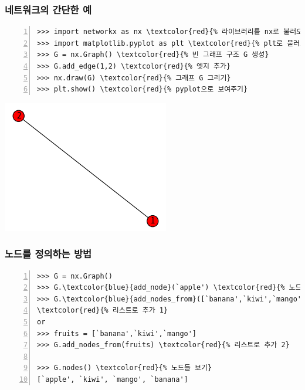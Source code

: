 \documentclass{beamer}
\begin{document}
\begin{frame}[fragile] %
\frametitle{네트워크의 간단한 예}
\begin{Verbatim}[numbers=left,commandchars=\\\{\}]
>>> import networkx as nx \textcolor{red}{% 라이브러리를 nx로 불러오기}
>>> import matplotlib.pyplot as plt \textcolor{red}{% plt로 불러오기}
>>> G = nx.Graph() \textcolor{red}{% 빈 그래프 구조 G 생성}
>>> G.add_edge(1,2) \textcolor{red}{% 엣지 추가}
>>> nx.draw(G) \textcolor{red}{% 그래프 G 그리기}
>>> plt.show() \textcolor{red}{% pyplot으로 보여주기}
\end{Verbatim}
\begin{center}
\includegraphics[scale=0.55]{line1.png}
\end{center}
\end{frame}

\begin{frame}[fragile]
\frametitle{노드를 정의하는 방법}
\begin{block}{}
\begin{Verbatim}[numbers=left,commandchars=\\\{\}]
>>> G = nx.Graph()
>>> G.\textcolor{blue}{add_node}(`apple') \textcolor{red}{% 노드 `apple' 추가}
>>> G.\textcolor{blue}{add_nodes_from}([`banana',`kiwi',`mango']) 
\textcolor{red}{% 리스트로 추가 1}
or
>>> fruits = [`banana',`kiwi',`mango']
>>> G.add_nodes_from(fruits) \textcolor{red}{% 리스트로 추가 2}

>>> G.nodes() \textcolor{red}{% 노드들 보기}
[`apple', `kiwi', `mango', `banana']
\end{Verbatim}
\end{block}
\end{frame}
\end{document}
